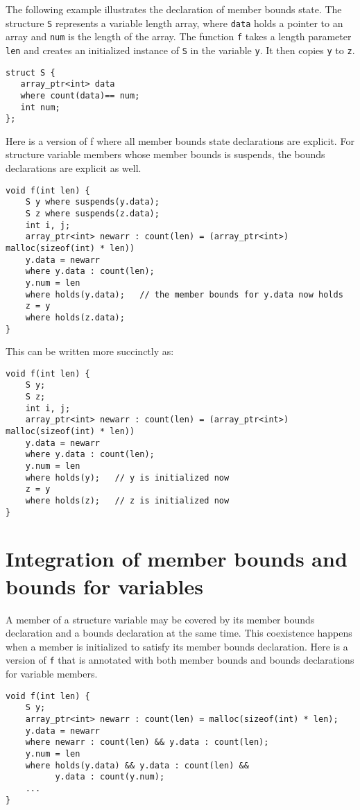 The following example illustrates the declaration of member bounds
state. The structure \texttt{S} represents a variable length array,
where \texttt{data} holds a pointer to an array and \texttt{num} is the 
length of the array. The function \texttt{f} takes a length parameter  
\texttt{len} and creates an initialized instance of \texttt{S} in the 
variable \texttt{y}.  It then copies \texttt{y} to \texttt{z}.

\begin{verbatim}
struct S {
   array_ptr<int> data
   where count(data)== num;
   int num;
};
\end{verbatim}

Here is a version of f where all member bounds state declarations are
explicit. For structure variable members whose member bounds is
suspends, the bounds declarations are explicit as well.

\begin{verbatim}
void f(int len) {
    S y where suspends(y.data);
    S z where suspends(z.data);
    int i, j;
    array_ptr<int> newarr : count(len) = (array_ptr<int>) malloc(sizeof(int) * len))
    y.data = newarr
    where y.data : count(len);
    y.num = len
    where holds(y.data);   // the member bounds for y.data now holds
    z = y
    where holds(z.data);
}
\end{verbatim}

This can be written more succinctly as:

\begin{verbatim}
void f(int len) {
    S y;
    S z;
    int i, j;
    array_ptr<int> newarr : count(len) = (array_ptr<int>) malloc(sizeof(int) * len))
    y.data = newarr
    where y.data : count(len);
    y.num = len
    where holds(y);   // y is initialized now
    z = y
    where holds(z);   // z is initialized now
}
\end{verbatim}

\section{Integration of member bounds and bounds for variables}

A member of a structure variable may be covered by its member bounds
declaration and a bounds declaration at the same time. This coexistence
happens when a member is initialized to satisfy its member bounds
declaration. Here is a version of \texttt{f} that is annotated with both member
bounds and bounds declarations for variable members.
\begin{verbatim}
void f(int len) {
    S y;
    array_ptr<int> newarr : count(len) = malloc(sizeof(int) * len);
    y.data = newarr
    where newarr : count(len) && y.data : count(len);
    y.num = len
    where holds(y.data) && y.data : count(len) && 
          y.data : count(y.num);
    ...
}
\end{verbatim}

